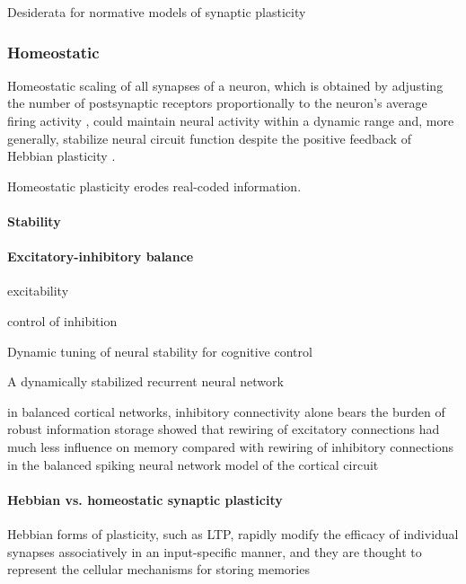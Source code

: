 \documentclass{article}
\theoremstyle{definition} \newtheorem{definition}{Definition}
\theoremstyle{remark} \newtheorem{remark}{Remark}
\newcounter{ct}
\begin{document}
Desiderata for normative models of synaptic plasticity \citep{bredenberg2024desiderata}

\subsubsection{Homeostatic} \citep{turrigiano2004homeostatic}

Homeostatic scaling of all synapses of a neuron, which is obtained by adjusting the number of postsynaptic receptors proportionally to the neuron’s average firing activity \citep{turrigiano1998activity,turrigiano1999homeostatic},
 could maintain neural activity within a dynamic range and, more generally, stabilize neural circuit function despite the positive feedback of Hebbian plasticity \citep{toyoizumi2014modeling}. 
 
 \citep{niemeyer2021homeostasis}
 \citep{oleary2018homeostasis}
 
 Homeostatic plasticity erodes real-coded information\citep{susman2019memory}.
 
 \paragraph{Stability}
 \citep{aljaberi2021global}
 
 \paragraph{Excitatory-inhibitory balance}%
 
 excitability \citep{daoudal2003long}
 
 control of inhibition \citep{machens2005flexible}

 Dynamic tuning of neural stability for cognitive control \citep{xu2024dynamic}
 
 A dynamically stabilized recurrent neural network \citep{saab2022stabilized}
 
 in balanced cortical networks, inhibitory connectivity alone bears the burden of robust information storage\citep{mongillo2018inhibitory}
\citep{mongillo2018inhibitory} showed that rewiring of excitatory connections had much less influence on memory compared with rewiring of inhibitory connections in the balanced spiking neural network model of the cortical circuit
 
\paragraph{Hebbian vs. homeostatic synaptic plasticity}
\citep{pozo2010unraveling}
Hebbian forms of plasticity, such as LTP, rapidly modify the efficacy of individual synapses associatively in an input-specific manner, and they are thought to represent the cellular mechanisms for storing memories
\end{document}
